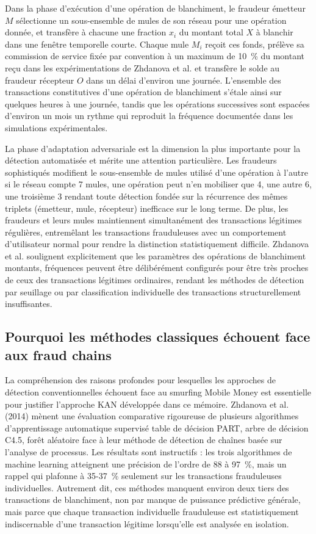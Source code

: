 \documentclass[11pt,a4paper,oneside]{report}
\theoremstyle{definition}
\theoremstyle{remark}
\begin{document}
Dans la phase d'exécution d'une opération de blanchiment, le fraudeur émetteur $M$ sélectionne un sous-ensemble de mules de son réseau pour une opération donnée, et transfère à chacune une fraction $x_i$ du montant total $X$ à blanchir dans une fenêtre temporelle courte. Chaque mule $M_i$ reçoit ces fonds, prélève sa commission de service  fixée par convention à un maximum de 10~\% du montant reçu dans les expérimentations de Zhdanova et al.  et transfère le solde au fraudeur récepteur $O$ dans un délai d'environ une journée. L'ensemble des transactions constitutives d'une opération de blanchiment s'étale ainsi sur quelques heures à une journée, tandis que les opérations successives sont espacées d'environ un mois  un rythme qui reproduit la fréquence documentée dans les simulations expérimentales.

La phase d'adaptation adversariale est la dimension la plus importante pour la détection automatisée et mérite une attention particulière. Les fraudeurs sophistiqués modifient le sous-ensemble de mules utilisé d'une opération à l'autre  si le réseau compte 7 mules, une opération peut n'en mobiliser que 4, une autre 6, une troisième 3  rendant toute détection fondée sur la récurrence des mêmes triplets (émetteur, mule, récepteur) inefficace sur le long terme. De plus, les fraudeurs et leurs mules maintiennent simultanément des transactions légitimes régulières, entremêlant les transactions frauduleuses avec un comportement d'utilisateur normal pour rendre la distinction statistiquement difficile. Zhdanova et al. soulignent explicitement que les paramètres des opérations de blanchiment  montants, fréquences  peuvent être délibérément configurés pour être très proches de ceux des transactions légitimes ordinaires, rendant les méthodes de détection par seuillage ou par classification individuelle des transactions structurellement insuffisantes.

\subsection{Pourquoi les méthodes classiques échouent face aux fraud chains}

La compréhension des raisons profondes pour lesquelles les approches de détection conventionnelles échouent face au smurfing Mobile Money est essentielle pour justifier l'approche KAN développée dans ce mémoire. Zhdanova et al. (2014) mènent une évaluation comparative rigoureuse de plusieurs algorithmes d'apprentissage automatique supervisé  table de décision PART, arbre de décision C4.5, forêt aléatoire  face à leur méthode de détection de chaînes basée sur l'analyse de processus. Les résultats sont instructifs : les trois algorithmes de machine learning atteignent une précision de l'ordre de 88 à 97~\%, mais un rappel qui plafonne à 35-37~\% seulement sur les transactions frauduleuses individuelles. Autrement dit, ces méthodes manquent environ deux tiers des transactions de blanchiment, non par manque de puissance prédictive générale, mais parce que chaque transaction individuelle frauduleuse est statistiquement indiscernable d'une transaction légitime lorsqu'elle est analysée en isolation.
\end{document}
